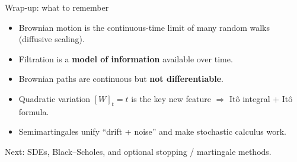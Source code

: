 \documentclass[10pt,aspectratio=169]{beamer}
\begin{document}
\begin{frame}{Wrap-up: what to remember}
\begin{itemize}
  \item Brownian motion is the continuous-time limit of many random walks (diffusive scaling).
  \item Filtration is a \textbf{model of information} available over time.
  \item Brownian paths are continuous but \textbf{not differentiable}.
  \item Quadratic variation $[W]_t=t$ is the key new feature $\Rightarrow$ It\^o integral + It\^o formula.
  \item Semimartingales unify ``drift + noise'' and make stochastic calculus work.
\end{itemize}

\medskip
\centering
\textcolor{BootcampBlueDark}{Next: SDEs, Black--Scholes, and optional stopping / martingale methods.}
\end{frame}
\end{document}

